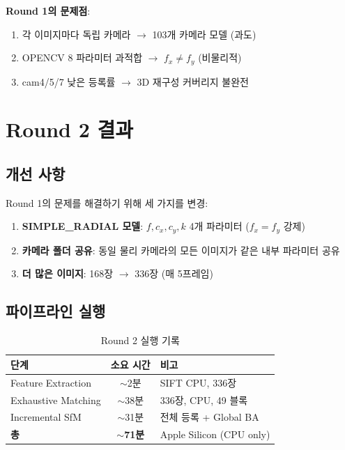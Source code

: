 \documentclass[11pt, a4paper]{report}
\begin{document}
\begin{warningbox}
\textbf{Round 1의 문제점}:
\begin{enumerate}[nosep]
  \item 각 이미지마다 독립 카메라 $\rightarrow$ 103개 카메라 모델 (과도)
  \item OPENCV 8 파라미터 과적합 $\rightarrow$ $f_x \neq f_y$ (비물리적)
  \item cam4/5/7 낮은 등록률 $\rightarrow$ 3D 재구성 커버리지 불완전
\end{enumerate}
\end{warningbox}


\chapter{Round 2 결과}

\section{개선 사항}

Round 1의 문제를 해결하기 위해 세 가지를 변경:
\begin{enumerate}[leftmargin=*]
  \item \textbf{SIMPLE\_RADIAL 모델}: $f, c_x, c_y, k$ 4개 파라미터 ($f_x = f_y$ 강제)
  \item \textbf{카메라 폴더 공유}: 동일 물리 카메라의 모든 이미지가 같은 내부 파라미터 공유
  \item \textbf{더 많은 이미지}: 168장 $\rightarrow$ 336장 (매 5프레임)
\end{enumerate}

\section{파이프라인 실행}

\begin{table}[H]
\centering
\caption{Round 2 실행 기록}
\renewcommand{\arraystretch}{1.3}
\begin{tabular}{lcl}
\toprule
\textbf{단계} & \textbf{소요 시간} & \textbf{비고} \\
\midrule
Feature Extraction & $\sim$2분 & SIFT CPU, 336장 \\
Exhaustive Matching & $\sim$38분 & 336장, CPU, 49 블록 \\
Incremental SfM & $\sim$31분 & 전체 등록 + Global BA \\
\midrule
\textbf{총} & \textbf{$\sim$71분} & Apple Silicon (CPU only) \\
\bottomrule
\end{tabular}
\end{table}
\end{document}
